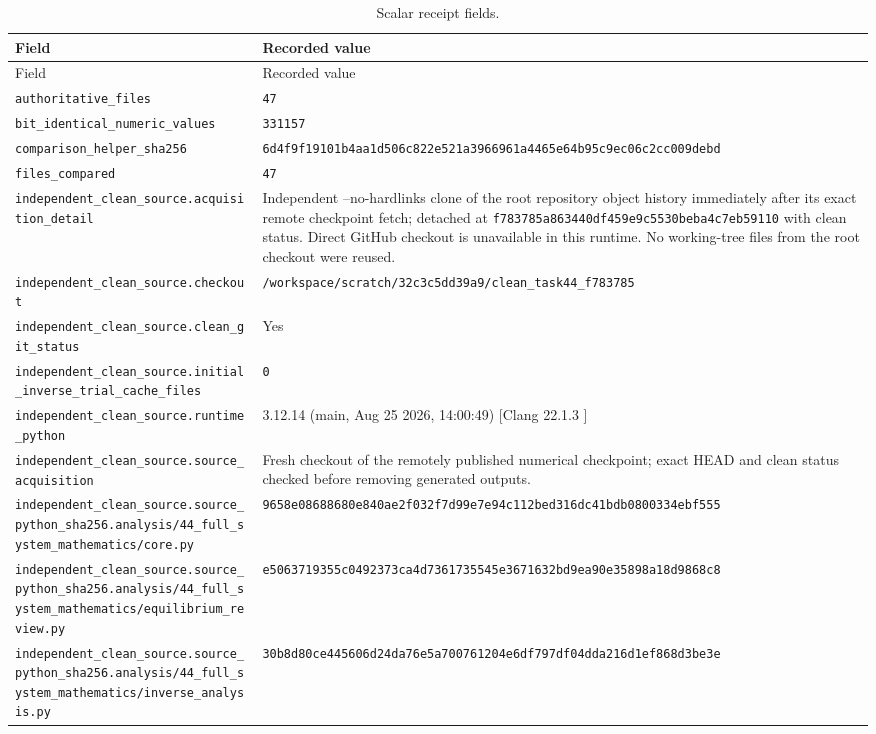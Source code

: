 \begingroup\scriptsize
\setlength{\tabcolsep}{3pt}
\begin{longtable}{p{.46\linewidth}p{.46\linewidth}}
\caption{Scalar receipt fields.}\\
\toprule
Field & Recorded value \\
\midrule\endfirsthead
\toprule
Field & Recorded value \\
\midrule\endhead
\bottomrule\endfoot
\nolinkurl{authoritative_files} & \texttt{47} \\
\nolinkurl{bit_identical_numeric_values} & \texttt{331157} \\
\nolinkurl{comparison_helper_sha256} & \nolinkurl{6d4f9f19101b4aa1d506c822e521a3966961a4465e64b95c9ec06c2cc009debd} \\
\nolinkurl{files_compared} & \texttt{47} \\
\nolinkurl{independent_clean_source.acquisition_detail} & Independent --no-hardlinks clone of the root repository object history immediately after its exact remote checkpoint fetch; detached at \nolinkurl{f783785a863440df459e9c5530beba4c7eb59110} with clean status. Direct GitHub checkout is unavailable in this runtime. No working-tree files from the root checkout were reused. \\
\nolinkurl{independent_clean_source.checkout} & \nolinkurl{/workspace/scratch/32c3c5dd39a9/clean_task44_f783785} \\
\nolinkurl{independent_clean_source.clean_git_status} & Yes \\
\nolinkurl{independent_clean_source.initial_inverse_trial_cache_files} & \texttt{0} \\
\nolinkurl{independent_clean_source.runtime_python} & 3.12.14 (main, Aug 25 2026, 14:00:49) [Clang 22.1.3 ] \\
\nolinkurl{independent_clean_source.source_acquisition} & Fresh checkout of the remotely published numerical checkpoint; exact HEAD and clean status checked before removing generated outputs. \\
\nolinkurl{independent_clean_source.source_python_sha256.analysis/44_full_system_mathematics/core.py} & \nolinkurl{9658e08688680e840ae2f032f7d99e7e94c112bed316dc41bdb0800334ebf555} \\
\nolinkurl{independent_clean_source.source_python_sha256.analysis/44_full_system_mathematics/equilibrium_review.py} & \nolinkurl{e5063719355c0492373ca4d7361735545e3671632bd9ea90e35898a18d9868c8} \\
\nolinkurl{independent_clean_source.source_python_sha256.analysis/44_full_system_mathematics/inverse_analysis.py} & \nolinkurl{30b8d80ce445606d24da76e5a700761204e6df797df04dda216d1ef868d3be3e} \\

\end{longtable}
